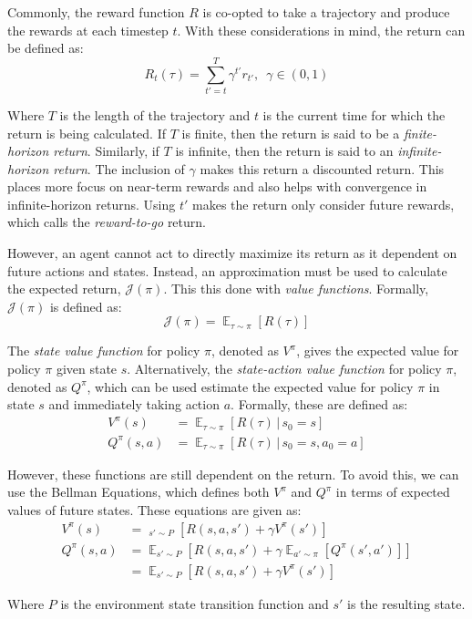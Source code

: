 \documentclass[conference]{IEEEtran}
\begin{document}
Commonly, the reward function $R$ is co-opted to take a trajectory and produce the rewards at each timestep $t$. With these considerations in mind, the return can be defined as:
$$
    R_t(\tau) = \sum_{t'=t}^T \gamma^{t'} r_{t'}, \enspace \gamma \in (0, 1)
$$

Where $T$ is the length of the trajectory and $t$ is the current time for which the return is being calculated. If $T$ is finite, then the return is said to be a \textit{finite-horizon return}. Similarly, if $T$ is infinite, then the return is said to an \textit{infinite-horizon return}. The inclusion of $\gamma$ makes this return a discounted return. This places more focus on near-term rewards and also helps with convergence in infinite-horizon returns. Using $t'$ makes the return only consider future rewards, which \cite{spinning_up_policy_optimization} calls the \textit{reward-to-go} return.

However, an agent cannot act to directly maximize its return as it dependent on future actions and states. Instead, an approximation must be used to calculate the expected return, $\mathcal{J}(\pi)$. This this done with \textit{value functions}. Formally, $\mathcal{J}(\pi)$ is defined as:
$$
    \mathcal{J}(\pi) = \mathop{\mathbb{E}}_{\tau \sim \pi}[R(\tau)]
$$

The \textit{state value function} for policy $\pi$, denoted as $V^\pi$, gives the expected value for policy $\pi$ given state $s$. Alternatively, the \textit{state-action value function} for policy $\pi$, denoted as $Q^\pi$, which can be used estimate the expected value for policy $\pi$ in state $s$ and immediately taking action $a$. Formally, these are defined as:
\begin{align*}
    V^\pi(s)    & = \mathop{\mathbb{E}}_{\tau \sim \pi}[R(\tau) \, | \, s_0 = s]          \\
    Q^\pi(s, a) & = \mathop{\mathbb{E}}_{\tau \sim \pi}[R(\tau) \, | \, s_0 = s, a_0 = a]
\end{align*}

However, these functions are still dependent on the return. To avoid this, we can use the Bellman Equations, which defines both $V^\pi$ and $Q^\pi$ in terms of expected values of future states. \cite{deep_rl_survey, spinning_up_intro, sutton2018reinforcement} These equations are given as:
\begin{align*}
    V^\pi(s)    & = \mathop{\mathop{\mathbb{E}}_{a \sim \pi}}_{s' \sim P} \left[ R(s, a, s') + \gamma V^\pi(s')\right]                  \\
    Q^\pi(s, a) & = \mathop{\mathbb{E}}_{s' \sim P} \left[ R(s, a, s') + \gamma\mathop{\mathbb{E}}_{a' \sim \pi} [Q^\pi(s', a')]\right] \\
                & = \mathop{\mathbb{E}}_{s' \sim P}\left [ R(s, a, s') + \gamma V^\pi(s') \right]
\end{align*}
\begin{flushleft}
    Where $P$ is the environment state transition function and $s'$ is the resulting state.
\end{flushleft}
\end{document}
